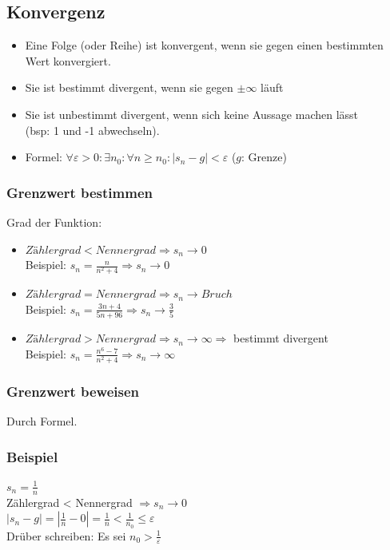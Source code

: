 \documentclass[a4paper,portrait]{scrartcl}
\begin{document}
\subsection{Konvergenz}
\begin{itemize}
	\item Eine Folge (oder Reihe) ist konvergent, wenn sie gegen einen bestimmten Wert konvergiert.
	\item Sie ist bestimmt divergent, wenn sie gegen $ \pm  \infty $ läuft
	\item Sie ist unbestimmt divergent, wenn sich keine Aussage machen lässt \\ (bsp: 1 und -1 abwechseln).
	\item Formel: $\forall \varepsilon > 0: \exists n_0: \forall n \geq n_0: |s_n - g| < \varepsilon$ ($g$: Grenze)
\end{itemize}
\subsubsection*{Grenzwert bestimmen}
Grad der Funktion:
\begin{itemize}
  \item $Zählergrad < Nennergrad \Rightarrow  s_{n} \rightarrow 0$ \\
  Beispiel: $s_{n} = \frac{n}{n^2+4} \Rightarrow s_{n} \rightarrow 0$
  \item $Zählergrad = Nennergrad \Rightarrow  s_{n} \rightarrow Bruch$ \\
    Beispiel: $s_{n} = \frac{3n+4}{5n+96} \Rightarrow s_{n} \rightarrow \frac{3}{5}$
  \item $Zählergrad > Nennergrad \Rightarrow  s_{n} \rightarrow \infty \Rightarrow $ bestimmt divergent \\
    Beispiel: $s_{n} = \frac{n^6-7}{n^2+4} \Rightarrow s_{n} \rightarrow \infty$
\end{itemize}
\subsubsection*{Grenzwert beweisen}
Durch Formel.
\subsubsection*{Beispiel}
$ s_n = \frac{1}{n} $ \\
Zählergrad < Nennergrad $\Rightarrow  s_{n} \rightarrow 0$ \\
$ |s_n - g| = |\frac{1}{n} - 0| = \frac{1}{n} < \frac{1}{n_0} \leq \varepsilon$ \\
Drüber schreiben: Es sei $n_0 > \frac{1}{\varepsilon}$
\end{document}
